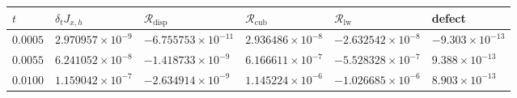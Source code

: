 \begin{tabular}{llllll}
\toprule
\(t\) & \(\delta_t J_{x,h}\) & \(\mathcal{R}_{\mathrm{disp}}\) & \(\mathcal{R}_{\mathrm{cub}}\) & \(\mathcal{R}_{\mathrm{lw}}\) & defect \\
\midrule
\(0.0005\) & \(2.970957\times10^{-9}\) & \(-6.755753\times10^{-11}\) & \(2.936486\times10^{-8}\) & \(-2.632542\times10^{-8}\) & \(-9.303\times10^{-13}\) \\
\(0.0055\) & \(6.241052\times10^{-8}\) & \(-1.418733\times10^{-9}\) & \(6.166611\times10^{-7}\) & \(-5.528328\times10^{-7}\) & \(9.388\times10^{-13}\) \\
\(0.0100\) & \(1.159042\times10^{-7}\) & \(-2.634914\times10^{-9}\) & \(1.145224\times10^{-6}\) & \(-1.026685\times10^{-6}\) & \(8.903\times10^{-13}\) \\
\bottomrule
\end{tabular}
